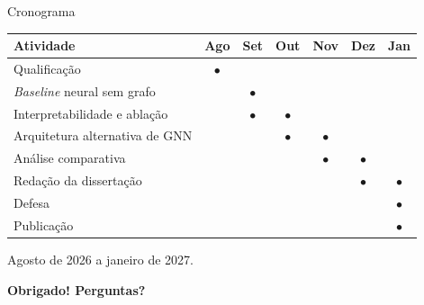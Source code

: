 \documentclass[aspectratio=169]{beamer}
\newcommand{\azul}[1]{\textcolor{ufprA}{\textbf{#1}}}
\begin{document}
\begin{frame}{Cronograma}
  \begin{center}
  \begin{tabular}{lcccccc}
  \toprule
  \textbf{Atividade} & \textbf{Ago} & \textbf{Set} & \textbf{Out} & \textbf{Nov} & \textbf{Dez} & \textbf{Jan} \\
  \midrule
  Qualificação                    & \textcolor{ufprB}{$\bullet$} & & & & & \\
  \emph{Baseline} neural sem grafo &  & \textcolor{ufprA}{$\bullet$} & & & & \\
  Interpretabilidade e ablação    &  & \textcolor{ufprA}{$\bullet$} & \textcolor{ufprA}{$\bullet$} & & & \\
  Arquitetura alternativa de GNN  &  & & \textcolor{ufprA}{$\bullet$} & \textcolor{ufprA}{$\bullet$} & & \\
  Análise comparativa             &  & & & \textcolor{ufprC}{$\bullet$} & \textcolor{ufprC}{$\bullet$} & \\
  Redação da dissertação          &  & & & & \textcolor{ufprC}{$\bullet$} & \textcolor{ufprC}{$\bullet$} \\
  Defesa                          &  & & & & & \textcolor{ufprB}{$\bullet$} \\
  Publicação                      &  & & & & & \textcolor{ufprB}{$\bullet$} \\
  \bottomrule
  \end{tabular}
  \end{center}
  \vfill
  \begin{center}\small Agosto de 2026 a janeiro de 2027.\end{center}
  \vfill
\end{frame}

\begin{frame}[plain]
  \vfill
  \begin{center}\Huge\azul{Obrigado! Perguntas?}\end{center}
  \vfill
\end{frame}


\end{document}

